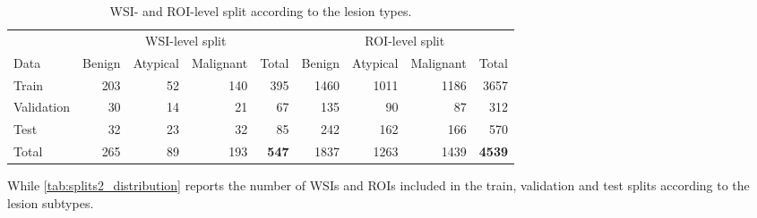 \documentclass[
11pt, %
english, %
singlespacing, %
headsepline, %
]{project_structure}
\begin{document}
\begin{table}[ht]
    \centering
    \small
    \begin{adjustbox}{max width=\textwidth} %
        \begin{tabular}{@{}l|rrrr|rrrr@{}}
            \toprule
            & \multicolumn{4}{c|}{\acrshort{WSI}-level split} & \multicolumn{4}{c}{\acrshort{ROI}-level split} \\
            \cmidrule(l){2-5} \cmidrule(l){6-9}
            Data & Benign & Atypical & Malignant & Total & Benign & Atypical & Malignant & Total \\
            \midrule
            Train & 203 & 52 & 140 & 395 & 1460 & 1011 & 1186 & 3657 \\
            Validation & 30 & 14 & 21 & 67 & 135 & 90 & 87 & 312 \\
            Test & 32 & 23 & 32 & 85 & 242 & 162 & 166 & 570 \\
            \midrule
            Total & 265 & 89 & 193 & \textbf{547} & 1837 & 1263 & 1439 & \textbf{4539}\\
            \bottomrule
        \end{tabular}
    \end{adjustbox}
    \caption{\acrshort{WSI}- and \acrshort{ROI}-level split according to the lesion types.}
    \label{tab:splits_distrib}
\end{table}

\noindent While \autoref{tab:splits2_distribution} reports the number of \acrshort{WSI}s and \acrshort{ROI}s included in the train, validation and test splits according to the lesion subtypes.
\end{document}
